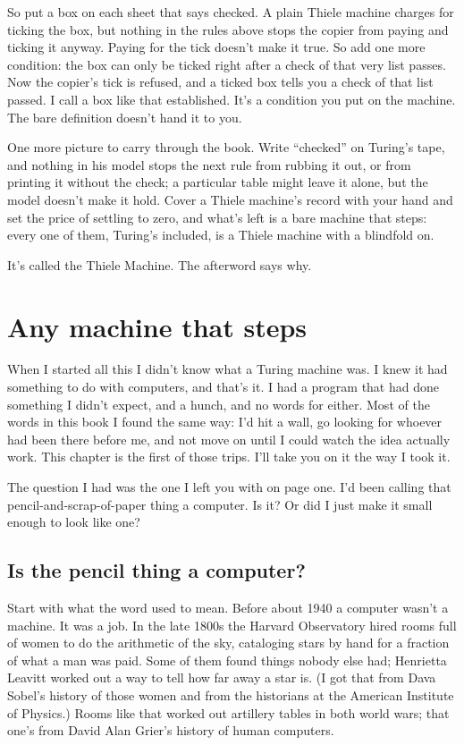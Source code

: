 \documentclass[11pt,twoside]{article}
\theoremstyle{thielethm}
\theoremstyle{thieledef}
\theoremstyle{thieledef}
\theoremstyle{thieledef}
\theoremstyle{thielethm}
\theoremstyle{thieleobs}
\theoremstyle{thielethm}
\begin{document}
So put a box on each sheet that says checked. A plain Thiele machine charges for ticking the box, but nothing in the rules above stops the copier from paying and ticking it anyway. Paying for the tick doesn't make it true. So add one more condition: the box can only be ticked right after a check of that very list passes. Now the copier's tick is refused, and a ticked box tells you a check of that list passed. I call a box like that established. It's a condition you put on the machine. The bare definition doesn't hand it to you.

One more picture to carry through the book. Write ``checked'' on Turing's tape, and nothing in his model stops the next rule from rubbing it out, or from printing it without the check; a particular table might leave it alone, but the model doesn't make it hold. Cover a Thiele machine's record with your hand and set the price of settling to zero, and what's left is a bare machine that steps: every one of them, Turing's included, is a Thiele machine with a blindfold on.

It's called the Thiele Machine. The afterword says why.

\section{Any machine that steps}
\label{sec:steps}

When I started all this I didn't know what a Turing machine was. I knew it had something to do with computers, and that's it. I had a program that had done something I didn't expect, and a hunch, and no words for either. Most of the words in this book I found the same way: I'd hit a wall, go looking for whoever had been there before me, and not move on until I could watch the idea actually work. This chapter is the first of those trips. I'll take you on it the way I took it.

The question I had was the one I left you with on page one. I'd been calling that pencil-and-scrap-of-paper thing a computer. Is it? Or did I just make it small enough to look like one?

\subsection{Is the pencil thing a computer?}

Start with what the word used to mean. Before about 1940 a computer wasn't a machine. It was a job. In the late 1800s the Harvard Observatory hired rooms full of women to do the arithmetic of the sky, cataloging stars by hand for a fraction of what a man was paid. Some of them found things nobody else had; Henrietta Leavitt worked out a way to tell how far away a star is. (I got that from Dava Sobel's history of those women and from the historians at the American Institute of Physics.) Rooms like that worked out artillery tables in both world wars; that one's from David Alan Grier's history of human computers.
\end{document}
